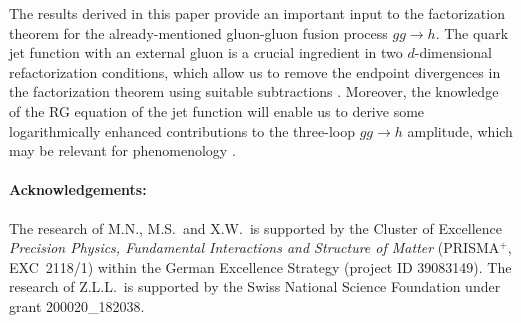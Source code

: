 \documentclass[12pt]{article}
\numberwithin{equation}{section}
\begin{document}
The results derived in this paper provide an important input to the factorization theorem for the already-mentioned gluon-gluon fusion process $gg\to h$. The quark jet function with an external gluon is a crucial ingredient in two $d$-dimensional refactorization conditions, which allow us to remove the endpoint divergences in the factorization theorem using suitable subtractions \cite{Liu:2019oav,Liu:2020tzd,Liu:2020wbn}. Moreover, the knowledge of the RG equation of the jet function will enable us to derive some logarithmically enhanced contributions to the three-loop $gg\to h$ amplitude, which may be relevant for phenomenology \cite{HiggsGluGlu}.


\paragraph{Acknowledgements:}	
The research of M.N., M.S.\ and X.W.\ is supported by the Cluster of Excellence {\em Precision Physics, Fundamental Interactions and Structure of Matter\/} (PRISMA${}^+$, EXC~2118/1) within the German Excellence Strategy (project ID 39083149). The research of Z.L.L.\ is supported by the Swiss National Science Foundation under grant 200020\_182038.
\end{document}

